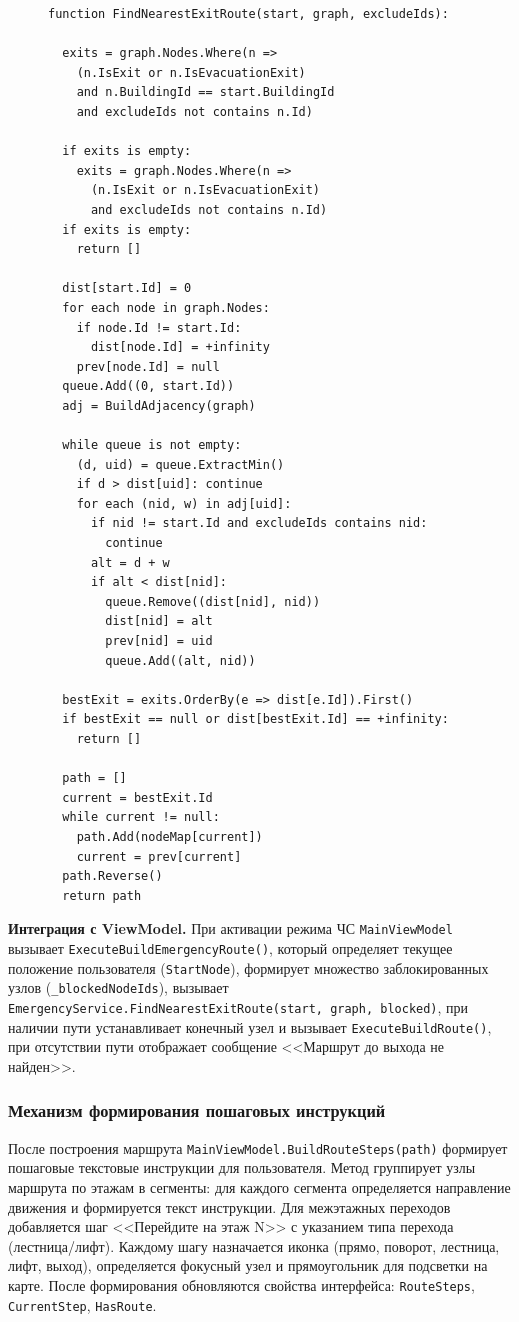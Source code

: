 \begin{figure}[H] 
\begin{lstlisting}
function FindNearestExitRoute(start, graph, excludeIds):

  exits = graph.Nodes.Where(n =>
    (n.IsExit or n.IsEvacuationExit)
    and n.BuildingId == start.BuildingId
    and excludeIds not contains n.Id)

  if exits is empty:
    exits = graph.Nodes.Where(n =>
      (n.IsExit or n.IsEvacuationExit)
      and excludeIds not contains n.Id)
  if exits is empty:
    return []

  dist[start.Id] = 0
  for each node in graph.Nodes:
    if node.Id != start.Id:
      dist[node.Id] = +infinity
    prev[node.Id] = null
  queue.Add((0, start.Id))
  adj = BuildAdjacency(graph)

  while queue is not empty:
    (d, uid) = queue.ExtractMin()
    if d > dist[uid]: continue
    for each (nid, w) in adj[uid]:
      if nid != start.Id and excludeIds contains nid:
        continue
      alt = d + w
      if alt < dist[nid]:
        queue.Remove((dist[nid], nid))
        dist[nid] = alt
        prev[nid] = uid
        queue.Add((alt, nid))

  bestExit = exits.OrderBy(e => dist[e.Id]).First()
  if bestExit == null or dist[bestExit.Id] == +infinity:
    return []

  path = []
  current = bestExit.Id
  while current != null:
    path.Add(nodeMap[current])
    current = prev[current]
  path.Reverse()
  return path
\end{lstlisting}
\end{figure}

\textbf{Интеграция с ViewModel.} При активации режима ЧС \texttt{MainViewModel} вызывает \texttt{ExecuteBuildEmergencyRoute()}, который определяет текущее положение пользователя (\texttt{StartNode}), формирует множество заблокированных узлов (\texttt{\_blockedNodeIds}), вызывает \texttt{EmergencyService.FindNearestExitRoute(start, graph, blocked)}, при наличии пути устанавливает конечный узел и вызывает \texttt{ExecuteBuildRoute()}, при отсутствии пути отображает сообщение <<Маршрут до выхода не найден>>.

\subsubsection{Механизм формирования пошаговых инструкций}

После построения маршрута \texttt{MainViewModel.BuildRouteSteps(path)} формирует пошаговые текстовые инструкции для пользователя. Метод группирует узлы маршрута по этажам в сегменты: для каждого сегмента определяется направление движения и формируется текст инструкции. Для межэтажных переходов добавляется шаг <<Перейдите на этаж N>> с указанием типа перехода (лестница/лифт). Каждому шагу назначается иконка (прямо, поворот, лестница, лифт, выход), определяется фокусный узел и прямоугольник для подсветки на карте. После формирования обновляются свойства интерфейса: \texttt{RouteSteps}, \texttt{CurrentStep}, \texttt{HasRoute}.


